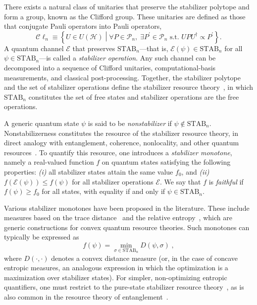 \documentclass[10pt,aps,pra,twocolumn,floatfix,nofootinbib,superscriptaddress,longbibliography]{revtex4-2}
\newcommand{\1}{\mathbbm{1}}
\begin{document}
There exists a natural class of unitaries that preserve the stabilizer polytope and form a group, known as the Clifford group. These unitaries are defined as those that conjugate Pauli operators into Pauli operators,
\begin{equation}
    \mathcal C\ell_n \!\equiv\! \left\{ U \in U(\mathcal H) \middle| \forall P \in \mathcal P_n,\; \exists P^\prime \in \mathcal P_n \text{ s.t. } U P U^\dagger \propto P^\prime \right\} .
\end{equation}
A quantum channel $\mathcal E$ that preserves $\mathrm{STAB}_n$—that is, $\mathcal E(\psi) \in \mathrm{STAB}_n$ for all $\psi \in \mathrm{STAB}_n$—is called a \emph{stabilizer operation}. Any such channel can be decomposed into a sequence of Clifford unitaries, computational-basis measurements, and classical post-processing. Together, the stabilizer polytope and the set of stabilizer operations define the stabilizer resource theory~\cite{Veitch_2014}, in which $\mathrm{STAB}_n$ constitutes the set of free states and stabilizer operations are the free operations.

A generic quantum state $\psi$ is said to be \emph{nonstabilizer} if $\psi \notin \mathrm{STAB}_n$. Nonstabilizerness constitutes the resource of the stabilizer resource theory, in direct analogy with entanglement, coherence, nonlocality, and other quantum resources~\cite{chitambar2019quantum}. To quantify this resource, one introduces a \emph{stabilizer monotone}, namely a real-valued function $f$ on quantum states satisfying the following properties: \emph{(i)} all stabilizer states attain the same value $f_0$, and \emph{(ii)} $f(\mathcal E(\psi)) \leq f(\psi)$ for all stabilizer operations $\mathcal E$. We say that $f$ is \emph{faithful} if $f(\psi) \geq  f_0$ for all states, with equality if and only if $\psi \in \mathrm{STAB}_n$.

Various stabilizer monotones have been proposed in the literature. These include measures based on the trace distance~\cite{junior2025geometric} and the relative entropy~\cite{Veitch_2014}, which are generic constructions for convex quantum resource theories. Such monotones can typically be expressed as
\begin{equation}
    f(\psi) = \min_{\sigma \in \mathrm{STAB}_n} D(\psi, \sigma)\;,
\end{equation}
where $D(\cdot,\cdot)$ denotes a convex distance measure (or, in the case of concave entropic measures, an analogous expression in which the optimization is a maximization over stabilizer states). For simpler, non-optimizing entropic quantifiers, one must restrict to the pure-state stabilizer resource theory~\cite{leone2022stabilizer}, as is also common in the resource theory of entanglement~\cite{nielsen2010quantum}.
\end{document}
